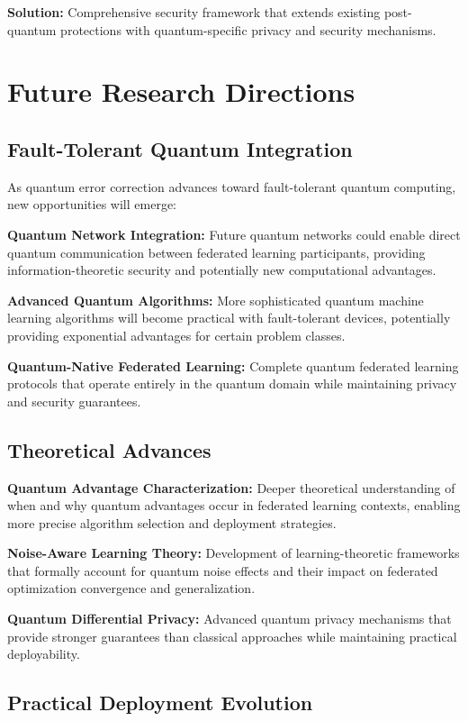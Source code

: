 \documentclass[10pt,journal,compsoc]{IEEEtran}
\begin{document}
\textbf{Solution:} Comprehensive security framework that extends existing post-quantum protections with quantum-specific privacy and security mechanisms.

\section{Future Research Directions}

\subsection{Fault-Tolerant Quantum Integration}

As quantum error correction advances toward fault-tolerant quantum computing, new opportunities will emerge:

\textbf{Quantum Network Integration:} Future quantum networks could enable direct quantum communication between federated learning participants, providing information-theoretic security and potentially new computational advantages.

\textbf{Advanced Quantum Algorithms:} More sophisticated quantum machine learning algorithms will become practical with fault-tolerant devices, potentially providing exponential advantages for certain problem classes.

\textbf{Quantum-Native Federated Learning:} Complete quantum federated learning protocols that operate entirely in the quantum domain while maintaining privacy and security guarantees.

\subsection{Theoretical Advances}

\textbf{Quantum Advantage Characterization:} Deeper theoretical understanding of when and why quantum advantages occur in federated learning contexts, enabling more precise algorithm selection and deployment strategies.

\textbf{Noise-Aware Learning Theory:} Development of learning-theoretic frameworks that formally account for quantum noise effects and their impact on federated optimization convergence and generalization.

\textbf{Quantum Differential Privacy:} Advanced quantum privacy mechanisms that provide stronger guarantees than classical approaches while maintaining practical deployability.

\subsection{Practical Deployment Evolution}
\end{document}
